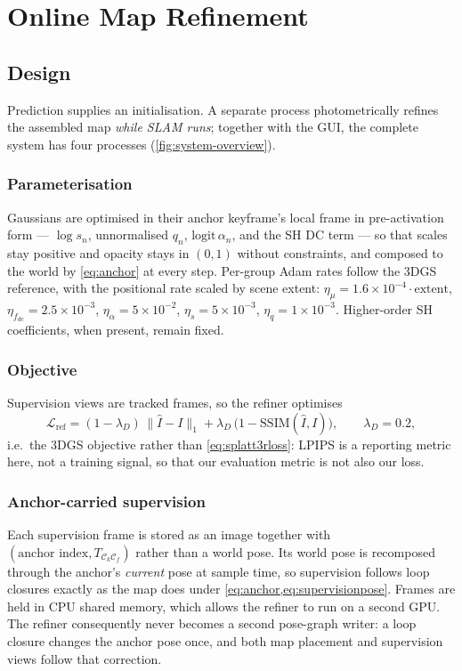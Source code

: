 \chapter{Online Map Refinement}
\label{ch:refiner}

\section{Design}
\label{sec:method:refiner}

Prediction supplies an initialisation. A separate process photometrically
refines the assembled map \emph{while SLAM runs}; together with the GUI,
the complete system has four processes (\cref{fig:system-overview}).

\subsection{Parameterisation}
Gaussians are optimised in their anchor keyframe's local frame in
pre-activation form --- $\log s_n$, unnormalised $q_n$,
$\mathrm{logit}\,\alpha_n$, and the SH DC term --- so that scales stay
positive and opacity stays in
$(0,1)$ without constraints, and composed to the world by
\cref{eq:anchor} at every step. Per-group Adam rates follow the 3DGS
reference, with the positional rate scaled by scene extent:
$\eta_\mu = 1.6\!\times\!10^{-4}\!\cdot\!\mathrm{extent}$,
$\eta_{f_{dc}} = 2.5\!\times\!10^{-3}$, $\eta_\alpha = 5\!\times\!10^{-2}$,
$\eta_s = 5\!\times\!10^{-3}$, $\eta_q = 1\!\times\!10^{-3}$.
Higher-order SH coefficients, when present, remain fixed.

\subsection{Objective}
Supervision views are tracked frames, so the refiner optimises
\begin{equation}
\mathcal{L}_{\text{ref}} = (1-\lambda_{D})\,\lVert \hat{I}-I \rVert_1
                          + \lambda_{D}\,\bigl(1-\mathrm{SSIM}(\hat{I},I)\bigr),
\qquad \lambda_{D}=0.2 ,
\label{eq:refloss}
\end{equation}
i.e.\ the 3DGS objective rather than \cref{eq:splatt3rloss}: LPIPS is a
reporting metric here, not a training signal, so that our evaluation metric is
not also our loss.

\subsection{Anchor-carried supervision}
Each supervision frame is stored as an image together with
$(\text{anchor index},T_{\mathcal C_k\mathcal C_f})$ rather than a world pose. Its
world pose is recomposed through the anchor's \emph{current} pose at sample
time, so supervision follows loop closures exactly as the map does under
\cref{eq:anchor,eq:supervisionpose}. Frames are held in CPU shared memory,
which allows the refiner to run on a second GPU.
The refiner consequently never becomes a second pose-graph writer: a loop
closure changes the anchor pose once, and both map placement and supervision
views follow that correction.


